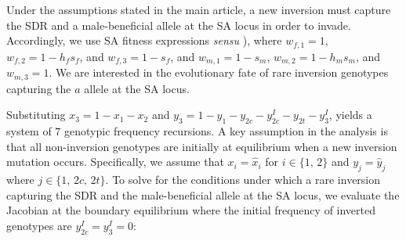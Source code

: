 \documentclass[11pt]{article}
\begin{document}
Under the assumptions stated in the main article, a new inversion must capture the SDR and a male-beneficial allele at the SA locus in order to invade. Accordingly, we use SA fitness expressions {\itshape sensu} \citealt{Kidwell1977,ConnallonClark2012,Otto2011}), where $w_{f,1} = 1$, $w_{f,2} = 1 - h_f s_f$, and $w_{f,3} = 1 - s_f$, and $w_{m,1} = 1 - s_m$, $w_{m,2} = 1 - h_m s_m$, and $w_{m,3} = 1$. We are interested in the evolutionary fate of rare inversion genotypes capturing the $a$ allele at the SA locus.

Substituting $x_3 = 1 - x_1 - x_2$ and $y_3 = 1 - y_1 - y_{2c} - y^I_{2c} - y_{2t} - y^I_3$, yields a system of $7$ genotypic frequency recursions. A key assumption in the analysis is that all non-inversion genotypes are initially at equilibrium when a new inversion mutation occurs. Specifically, we assume that $x_i = \hat{x}_i$ for $i \in \{1,\,2 \}$ and $y_j = \hat{y}_j$ where $j \in \{ 1,\,2c,\,2t \}$. To solve for the conditions under which a rare inversion capturing the SDR and the male-beneficial allele at the SA locus, we evaluate the Jacobian at the boundary equilibrium where the initial frequency of inverted genotypes are $y^{I}_{2c} = y^{I}_{3} = 0$:
\end{document}
